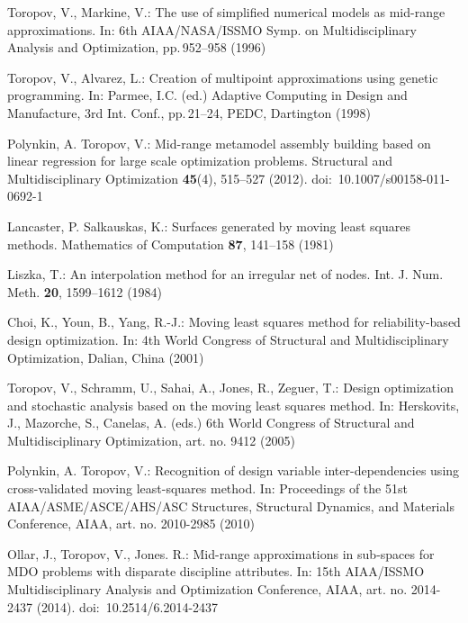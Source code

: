 \documentclass[a4paper]{llncs}
\begin{document}
\begin{thebibliography}{10}
Toropov, V., Markine, V.:
\newblock The use of simplified numerical models as mid-range approximations.
\newblock In: 6th AIAA/NASA/ISSMO Symp. on Multidisciplinary Analysis and Optimization, pp.\,952--958 (1996)

Toropov, V., Alvarez, L.:
\newblock Creation of multipoint approximations using genetic programming.
\newblock In: Parmee, I.C. (ed.) Adaptive Computing in Design and Manufacture, 3rd Int. Conf.,
   pp.\,21--24, PEDC, Dartington (1998)

Polynkin, A. Toropov, V.:
\newblock Mid-range metamodel assembly building based on linear regression for large scale optimization problems.
\newblock Structural and Multidisciplinary Optimization \textbf{45}(4), 515--527
(2012). doi:~10.1007/s00158-011-0692-1

Lancaster, P. Salkauskas, K.:
\newblock Surfaces generated by moving least squares methods.
\newblock Mathematics of Computation \textbf{87}, 141--158 (1981)

Liszka, T.:
\newblock An interpolation method for an irregular net of nodes.
\newblock Int. J. Num. Meth. \textbf{20}, 1599--1612 (1984)

Choi, K., Youn, B., Yang, R.-J.:
\newblock Moving least squares method for reliability-based design optimization.
\newblock In: 4th World Congress of Structural and Multidisciplinary Optimization, Dalian, China
(2001)

Toropov, V., Schramm, U., Sahai, A., Jones, R., Zeguer, T.:
\newblock Design optimization and stochastic analysis based on the moving least squares method.
\newblock In: Herskovits, J., Mazorche, S., Canelas, A. (eds.) 6th World Congress of Structural and Multidisciplinary Optimization, art. no. 9412
(2005)

Polynkin, A. Toropov, V.:
\newblock Recognition of design variable inter-dependencies using cross-validated moving least-squares method.
\newblock In: Proceedings of the 51st AIAA/ASME/ASCE/AHS/ASC Structures, Structural Dynamics, and Materials Conference, AIAA, art. no. 2010-2985
(2010)

Ollar, J., Toropov, V., Jones. R.:
\newblock  Mid-range approximations in sub-spaces for MDO problems with disparate discipline attributes.
\newblock In: 15th AIAA/ISSMO Multidisciplinary Analysis and Optimization Conference, AIAA, art. no. 2014-2437
(2014). doi:~10.2514/6.2014-2437 


\end{thebibliography}
\end{document}
